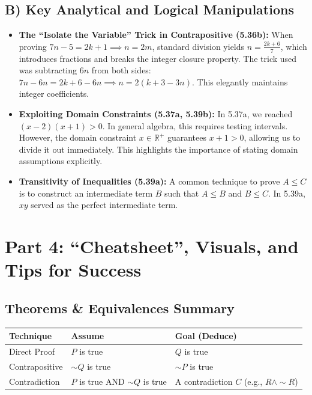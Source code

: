 \documentclass[11pt, a4paper]{article}
\theoremstyle{definition}
\theoremstyle{remark}
\newcommand{\R}{\mathbb{R}}
\begin{document}
\subsection{B) Key Analytical and Logical Manipulations}
\begin{itemize}
    \item \textbf{The ``Isolate the Variable'' Trick in Contrapositive (5.36b):} When proving $7n - 5 = 2k + 1 \implies n = 2m$, standard division yields $n = \frac{2k+6}{7}$, which introduces fractions and breaks the integer closure property. The trick used was subtracting $6n$ from both sides: $7n - 6n = 2k + 6 - 6n \implies n = 2(k + 3 - 3n)$. This elegantly maintains integer coefficients.
    \item \textbf{Exploiting Domain Constraints (5.37a, 5.39b):} In 5.37a, we reached $(x-2)(x+1) > 0$. In general algebra, this requires testing intervals. However, the domain constraint $x \in \R^+$ guarantees $x+1 > 0$, allowing us to divide it out immediately. This highlights the importance of stating domain assumptions explicitly.
    \item \textbf{Transitivity of Inequalities (5.39a):} A common technique to prove $A \leq C$ is to construct an intermediate term $B$ such that $A \leq B$ and $B \leq C$. In 5.39a, $xy$ served as the perfect intermediate term.
\end{itemize}

\section{Part 4: ``Cheatsheet'', Visuals, and Tips for Success}

\subsection{Theorems \& Equivalences Summary}
\begin{center}
\renewcommand{\arraystretch}{1.5}
\begin{tabular}{|l|l|l|}
\hline
\textbf{Technique} & \textbf{Assume} & \textbf{Goal (Deduce)} \\
\hline
Direct Proof & $P$ is true & $Q$ is true \\
Contrapositive & $\sim Q$ is true & $\sim P$ is true \\
Contradiction & $P$ is true AND $\sim Q$ is true & A contradiction $C$ (e.g., $R \land \sim R$) \\
\hline
\end{tabular}
\end{center}
\end{document}
